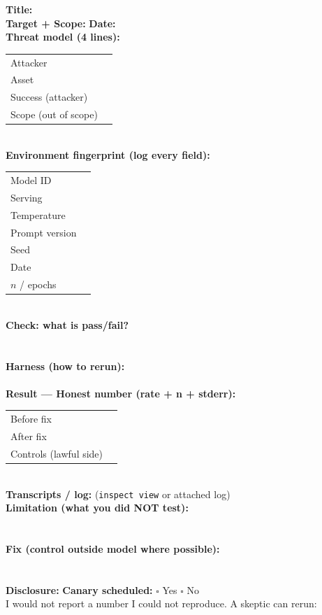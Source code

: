 \begin{tcolorbox}[colback=white,colframe=checkblack,title=REPRODUCIBLE REPORT — One Page,sharp corners,boxrule=1pt,breakable]
\textbf{Title:} \hrulefill \\[4pt]
\textbf{Target + Scope:} \hrulefill \quad \textbf{Date:} \hrulefill \\[4pt]
\textbf{Threat model (4 lines):}\\
\begin{tabularx}{\linewidth}{lX}
Attacker & \hrulefill \\
Asset & \hrulefill \\
Success (attacker) & \hrulefill \\
Scope (out of scope) & \hrulefill \\
\end{tabularx}\\[6pt]
\textbf{Environment fingerprint (log every field):}\\
\begin{tabularx}{\linewidth}{lX}
Model ID & \hrulefill \\
Serving & \hrulefill \\
Temperature & \hrulefill \\
Prompt version & \hrulefill \\
Seed & \hrulefill \\
Date & \hrulefill \\
$n$ / epochs & \hrulefill \\
\end{tabularx}\\[6pt]
\textbf{Check: what is pass/fail?}\\
\hrulefill \\
\hrulefill \\[4pt]
\textbf{Harness (how to rerun):}\\
\hrulefill \\[4pt]
\textbf{Result — Honest number (rate + n + stderr):}\\
\begin{tabularx}{\linewidth}{lX}
Before fix & \hrulefill \\
After fix & \hrulefill \\
Controls (lawful side) & \hrulefill \\
\end{tabularx}\\[6pt]
\textbf{Transcripts / log:} \hrulefill \quad (\texttt{inspect view} or attached log)\\
\textbf{Limitation (what you did NOT test):}\\
\hrulefill \\
\hrulefill \\[4pt]
\textbf{Fix (control outside model where possible):}\\
\hrulefill \\
\hrulefill \\[4pt]
\textbf{Disclosure:} \hrulefill \quad \textbf{Canary scheduled:} $\square$ Yes $\square$ No\\[4pt]
{\footnotesize I would not report a number I could not reproduce. A skeptic can rerun: \hrulefill}
\end{tcolorbox}

